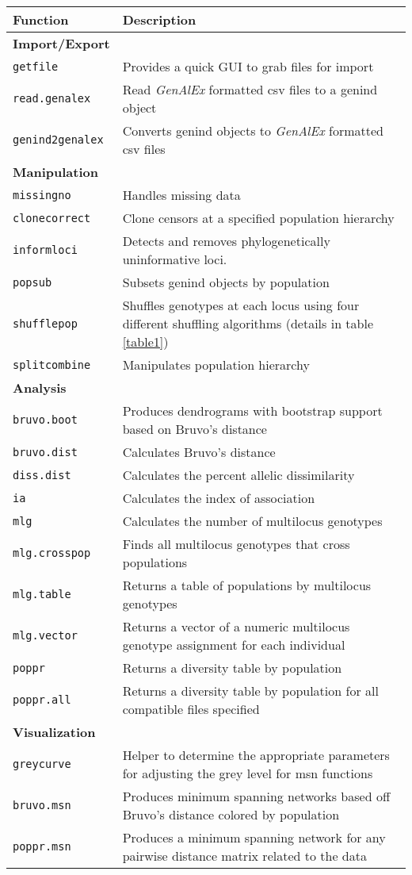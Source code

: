 \begin{sidewaystable}[ph!]
\begin{tabular}{ll}
\hline
Function & Description \\ 
\hline
\textbf{Import/Export} & \\
\texttt{getfile} & Provides a quick GUI to grab files for import \\
\texttt{read.genalex} & Read \textit{GenAlEx} formatted csv files to a genind object \\
\texttt{genind2genalex} & Converts genind objects to \textit{GenAlEx} formatted csv files \\
\hline
\textbf{Manipulation} & \\
\texttt{missingno} & Handles missing data \\
\texttt{clonecorrect} & Clone censors at a specified population hierarchy \\
\texttt{informloci} & Detects and removes phylogenetically uninformative loci. \\
\texttt{popsub} & Subsets genind objects by population \\
\texttt{shufflepop} & Shuffles genotypes at each locus using four different shuffling algorithms (details in table \ref{table1}) \\
\texttt{splitcombine} & Manipulates population hierarchy \\ 
\hline
\textbf{Analysis} & \\
\texttt{bruvo.boot} & Produces dendrograms with bootstrap support based on Bruvo's distance \\
\texttt{bruvo.dist} & Calculates Bruvo's distance \\
\texttt{diss.dist} & Calculates the percent allelic dissimilarity \\
\texttt{ia} & Calculates the index of association \\
\texttt{mlg} & Calculates the number of multilocus genotypes \\
\texttt{mlg.crosspop} & Finds all multilocus genotypes that cross populations \\
\texttt{mlg.table} & Returns a table of populations by multilocus genotypes \\
\texttt{mlg.vector} & Returns a vector of a numeric multilocus genotype assignment for each individual \\
\texttt{poppr} & Returns a diversity table by population \\
\texttt{poppr.all} & Returns a diversity table by population for all compatible files specified \\
\hline
\textbf{Visualization} & \\
\texttt{greycurve} & Helper to determine the appropriate parameters for adjusting the grey level for msn functions \\
\texttt{bruvo.msn} & Produces minimum spanning networks based off Bruvo's distance colored by population \\
\texttt{poppr.msn} & Produces a minimum spanning network for any pairwise distance matrix related to the data \\
\hline


\end{tabular}
\end{sidewaystable}
